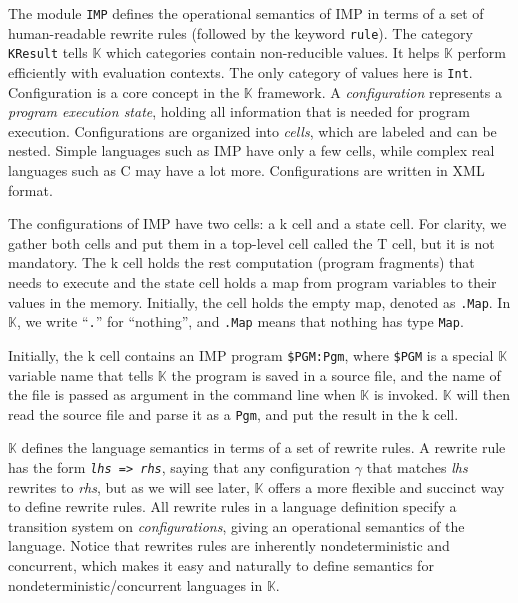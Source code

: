\documentclass[acmsmall,review,anonymous]{acmart}
\newcommand{\K}{$\mathbb{K}$\xspace}
\newcommand{\sfk}{\textsf{k}\xspace}
\newcommand{\sfstate}{\textsf{state}\xspace}
\newcommand{\KResult}{\texttt{KResult}\xspace}
\begin{document}
The module \texttt{IMP} defines the operational semantics of IMP
in terms of a set of human-readable rewrite rules (followed by the keyword 
\texttt{rule}).
The category \KResult tells \K which categories contain
non-reducible values.
It helps \K perform efficiently with evaluation contexts.
The only category of values here is \texttt{Int}.
Configuration is a core concept in the \K framework.
A \emph{configuration} represents a \emph{program execution state},
holding all information that is needed for program execution.
Configurations are organized into \emph{cells}, which are labeled
and can be nested.
Simple languages such as IMP have only a few cells, while
complex real languages such as C may have a lot more.
Configurations are written in XML format.

The configurations of IMP have two cells: a \sfk cell and a \sfstate cell.
For clarity, 
we gather both cells and put them 
in a top-level cell called the \textsf{T} cell,
but it is not mandatory.
The \sfk cell holds the rest computation (program fragments) that
needs to execute and 
the \sfstate cell holds a map from program variables to their values in 
the memory.
Initially, the \state cell holds the empty map, denoted as
\texttt{.Map}. 
In \K, we write ``\texttt{.}'' for ``nothing'',
and \texttt{.Map} means that nothing has type \texttt{Map}.

Initially, the \sfk cell contains an IMP program \texttt{\$PGM:Pgm},
where \texttt{\$PGM} is a special \K variable name
that tells \K the program is saved in a source file, and the name of
the file is passed as argument in the command line 
when \K is invoked.
\K will then read the source file and parse it as a
\texttt{Pgm}, and put the result in the \sfk cell.

\K defines the language semantics in terms of a set of rewrite rules.
A rewrite rule has the form 
\texttt{\textnormal{\textit{lhs}}\,=>\,\textnormal{\textit{rhs}}},
saying that any configuration $\gamma$ that matches \textnormal{\textit{lhs}}
rewrites to \textnormal{\textit{rhs}},
but as we will see later, \K offers a more flexible and succinct 
way to define rewrite rules.
All rewrite rules in a language definition
specify a transition system on \emph{configurations}, giving an 
operational semantics of the language.
Notice that rewrites rules are inherently nondeterministic and concurrent,
which makes it easy and naturally to define semantics for 
nondeterministic/concurrent languages in \K.
\end{document}
